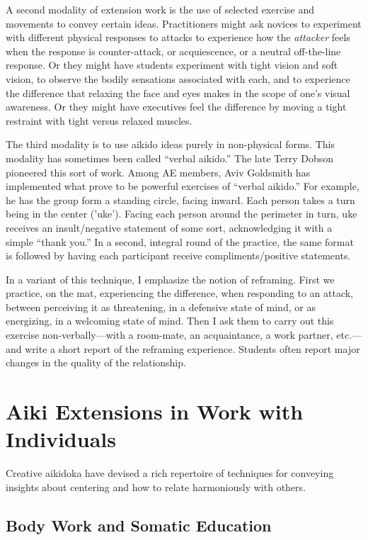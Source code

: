A second modality of extension work is the use of selected exercise and movements to convey certain ideas. Practitioners might ask novices to experiment with different physical responses to attacks to experience how the \emph{attacker} feels when the response is counter-attack, or acquiescence, or a neutral off-the-line response. Or they might have students experiment with tight vision and soft vision, to observe the bodily sensations associated with each, and to experience the difference that relaxing the face and eyes makes in the scope of one's visual awareness. Or they might have executives feel the difference by moving a tight restraint with tight versus relaxed muscles.

The third modality is to use aikido ideas purely in non-physical forms. This modality has sometimes been called ``verbal aikido.'' The late Terry Dobson pioneered this sort of work. Among AE members, Aviv Goldsmith has implemented what prove to be powerful exercises of ``verbal aikido.'' For example, he has the group form a standing circle, facing inward. Each person takes a turn being in the center ('uke'). Facing each person around the perimeter in turn, uke receives an insult/negative statement of some sort, acknowledging it with a simple ``thank you.'' In a second, integral round of the practice, the same format is followed by having each participant receive compliments/positive statements.

In a variant of this technique, I emphasize the notion of reframing. First we practice, on the mat, experiencing the difference, when responding to an attack, between perceiving it as threatening, in a defensive state of mind, or as energizing, in a welcoming state of mind. Then I ask them to carry out this exercise non-verbally---with a room-mate, an acquaintance, a work partner, etc.---and write a short report of the reframing experience. Students often report major changes in the quality of the relationship.

\section*{Aiki Extensions in Work with Individuals}

Creative aikidoka have devised a rich repertoire of techniques for conveying insights about centering and how to relate harmoniously with others.

\subsection*{Body Work and Somatic Education}

